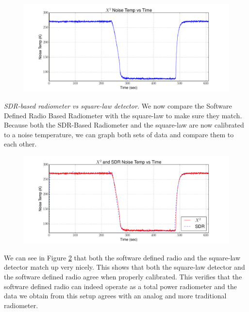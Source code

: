 {\begin{figure}[h!tb] \centering
\includegraphics[width=\textwidth]{Experiments/Exp1/x2_calibrated.pdf}
\label{X2_Calibrated}
\end{figure}

\emph{SDR-based radiometer vs square-law detector.}  We now compare the Software Defined Radio Based Radiometer with the square-law to make sure they match.  Because both the SDR-Based Radiometer and the square-law are now calibrated to a noise temperature, we can graph both sets of data and compare them to each other.

\begin{figure}[h!tb] \centering

\includegraphics[width=\textwidth]{Experiments/Exp1/x2_SDR_Calibrated.pdf}
\label{X2_SDR_Both}
\end{figure}

We can see in Figure \ref{X2_SDR_Both} that both the software defined radio and the square-law detector match up very nicely.  This shows that both the square-law detector and the software defined radio agree when properly calibrated.  This verifies that the software defined radio can indeed operate as a total power radiometer and the data we obtain from this setup agrees with an analog and more traditional radiometer.



}
